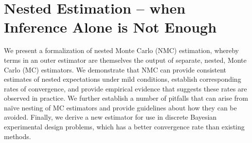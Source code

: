 
\chapter{Nested Estimation -- when Inference Alone is Not Enough}
\label{chp:nest}

We present a formalization of nested Monte Carlo (NMC) estimation, whereby
terms in an outer estimator are themselves the output of separate, nested, Monte Carlo (MC) estimators.
We demonstrate that NMC can provide consistent estimates of 
nested expectations under mild conditions, 
establish corresponding rates of convergence, 
and provide empirical evidence that suggests these rates are observed in practice.
We further establish a number of pitfalls that can arise from na\"{i}ve nesting of MC estimators
and provide guidelines about how they can be avoided.
Finally, we derive a new estimator for use in discrete Bayesian 
experimental design problems, which has a better convergence rate than 
existing methods.










\clearpage

